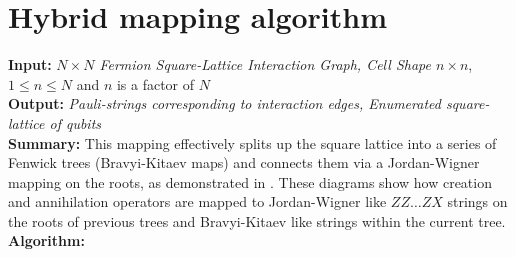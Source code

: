 \section{Hybrid mapping algorithm}
\label{section:Hybridmapping}
\noindent
\textbf{Input:} \textit{$N\times N$ Fermion Square-Lattice Interaction Graph, Cell Shape $n \times n$}, $1\le n\le N$ and $n$ is a factor of $N$\\
\textbf{Output:} \textit{Pauli-strings corresponding to interaction edges, Enumerated square-lattice of qubits}\\
\textbf{Summary:} This mapping effectively splits up the square lattice into a series of Fenwick trees (Bravyi-Kitaev maps) and connects them via a Jordan-Wigner mapping on the roots, as demonstrated in . These diagrams show how creation and annihilation operators are mapped to Jordan-Wigner like $ZZ\ldots ZX$ strings on the roots of previous trees and Bravyi-Kitaev like strings within the current tree.\\
\textbf{Algorithm:}

